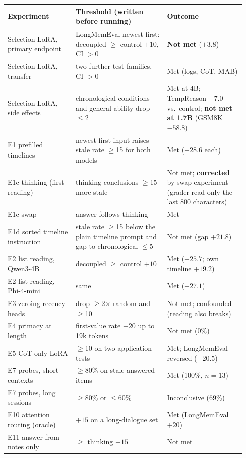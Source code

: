 \documentclass[11pt]{article}
\begin{document}
{\small
\begin{longtable}{@{}>{\raggedright\arraybackslash}p{0.27\linewidth}>{\raggedright\arraybackslash}p{0.36\linewidth}>{\raggedright\arraybackslash}p{0.31\linewidth}@{}}
\toprule
Experiment & Threshold (written before running) & Outcome \\
\midrule
\endhead
Selection LoRA, primary endpoint & LongMemEval newest first: decoupled $\geq$ control $+10$, CI $>0$ & \textbf{Not met} ($+3.8$) \\
Selection LoRA, transfer & two further test families, CI $>0$ & Met (logs, CoT, MAB) \\
Selection LoRA, side effects & chronological conditions and general ability drop $\leq$2 & Met at 4B; TempReason $-7.0$ vs.\ control; \textbf{not met at 1.7B} (GSM8K $-58.8$) \\
E1 prefilled timelines & newest-first input raises stale rate $\geq$15 for both models & Met ($+28.6$ each) \\
E1c thinking (first reading) & thinking conclusions $\geq$15 more stale & Not met; \textbf{corrected} by swap experiment (grader read only the last 800 characters) \\
E1c swap & answer follows thinking & Met \\
E1d sorted timeline instruction & stale rate $\geq$15 below the plain timeline prompt and gap to chronological $\leq$5 & Not met (gap $+21.8$) \\
E2 list reading, Qwen3-4B & decoupled $\geq$ control $+10$ & Met ($+25.7$; own timeline $+19.2$) \\
E2 list reading, Phi-4-mini & same & Met ($+27.1$) \\
E3 zeroing recency heads & drop $\geq$2$\times$ random and $\geq$10 & Not met; confounded (reading also breaks) \\
E4 primacy at length & first-value rate $+20$ up to 19k tokens & Not met (0\%) \\
E5 CoT-only LoRA & $\geq$10 on two application tests & Met; LongMemEval reversed ($-20.5$) \\
E7 probes, short contexts & $\geq$80\% on stale-answered items & Met (100\%, $n=13$) \\
E7 probes, long sessions & $\geq$80\% or $\leq$60\% & Inconclusive (69\%) \\
E10 attention routing (oracle) & $+15$ on a long-dialogue set & Met (LongMemEval $+20$) \\
E11 answer from notes only & $\geq$ thinking $+15$ & Not met \\

\end{longtable}}
\end{document}
